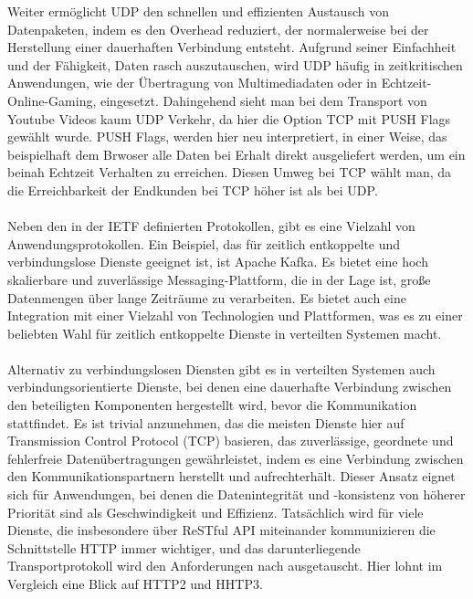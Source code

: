 \documentclass[../vs-script-first-v01.tex]{subfiles}
\begin{document}
Weiter ermöglicht UDP  den schnellen und effizienten Austausch von Datenpaketen, indem es den Overhead reduziert, der normalerweise bei der Herstellung einer dauerhaften Verbindung entsteht. Aufgrund seiner Einfachheit und der Fähigkeit, Daten rasch auszutauschen, wird UDP häufig in zeitkritischen Anwendungen, wie der Übertragung von Multimediadaten oder in Echtzeit-Online-Gaming, eingesetzt. Dahingehend sieht man bei dem Transport von Youtube Videos kaum UDP Verkehr, da hier die Option TCP mit PUSH Flags gewählt wurde. PUSH Flags, werden hier neu interpretiert, in einer Weise, das beispielhaft dem Brwoser alle Daten bei Erhalt direkt ausgeliefert werden, um ein beinah Echtzeit Verhalten zu erreichen. Diesen Umweg bei TCP wählt man, da die Erreichbarkeit der Endkunden bei TCP höher ist als bei UDP.
\\\\
Neben den in der IETF definierten Protokollen, gibt es eine Vielzahl von Anwendungsprotokollen. Ein Beispiel, das für zeitlich entkoppelte und verbindungslose Dienste geeignet ist, ist Apache Kafka. Es bietet eine hoch skalierbare und zuverlässige Messaging-Plattform, die in der Lage ist, große Datenmengen über lange Zeiträume zu verarbeiten. Es bietet auch eine Integration mit einer Vielzahl von Technologien und Plattformen, was es zu einer beliebten Wahl für zeitlich entkoppelte Dienste in verteilten Systemen macht.
\\\\
Alternativ zu verbindungslosen Diensten gibt es in verteilten Systemen auch verbindungsorientierte Dienste, bei denen eine dauerhafte Verbindung zwischen den beteiligten Komponenten hergestellt wird, bevor die Kommunikation stattfindet. Es ist trivial anzunehmen, das die meisten Dienste hier auf Transmission Control Protocol (TCP) basieren, das zuverlässige, geordnete und fehlerfreie Datenübertragungen gewährleistet, indem es eine Verbindung zwischen den Kommunikationspartnern herstellt und aufrechterhält. Dieser Ansatz eignet sich für Anwendungen, bei denen die Datenintegrität und -konsistenz von höherer Priorität sind als Geschwindigkeit und Effizienz. Tatsächlich wird für viele Dienste, die insbesondere über ReSTful API miteinander kommunizieren die Schnittstelle HTTP immer wichtiger, und das darunterliegende Transportprotokoll wird den Anforderungen nach ausgetauscht. Hier lohnt im Vergleich eine Blick auf HTTP2 und HHTP3.
\\\\
\end{document}
